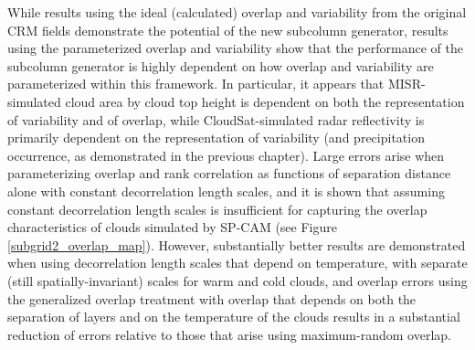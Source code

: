 While results using the ideal (calculated) overlap and variability from the original CRM fields demonstrate the potential of the new subcolumn generator, results using the parameterized overlap and variability show that the performance of the subcolumn generator is highly dependent on how overlap and variability are parameterized within this framework. In particular, it appears that MISR-simulated cloud area by cloud top height is dependent on both the representation of variability and of overlap, while CloudSat-simulated radar reflectivity is primarily dependent on the representation of variability (and precipitation occurrence, as demonstrated in the previous chapter). Large errors arise when parameterizing overlap and rank correlation as functions of separation distance alone with constant decorrelation length scales, and it is shown that assuming constant decorrelation length scales is insufficient for capturing the overlap characteristics of clouds simulated by SP-CAM (see Figure \ref{subgrid2_overlap_map}). However, substantially better results are demonstrated when using decorrelation length scales that depend on temperature, with separate (still spatially-invariant) scales for warm and cold clouds, and overlap errors using the generalized overlap treatment with overlap that depends on both the separation of layers and on the temperature of the clouds results in a substantial reduction of errors relative to those that arise using maximum-random overlap.

